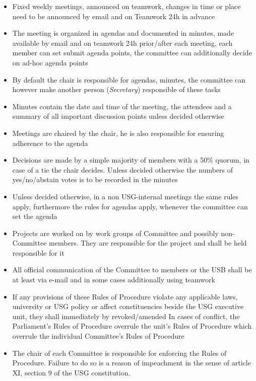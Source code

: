 \begin{itemize}
	\item Fixed weekly meetings, announced on teamwork, changes in time or place need to be announced by email and on Teamwork 24h in advance
	\item The meeting is organized in agendas and documented in minutes, made available by email and on teamwork 24h prior/after each meeting, each member can set submit agenda points, the committee can additionally decide on ad-hoc agenda points
	\item By default the chair is responsible for agendas, minutes, the committee can however make another person (\emph{Secretary}) responsible of these tasks
	\item Minutes contain the date and time of the meeting, the attendees and a summary of all important discussion points unless decided otherwise
	\item Meetings are chaired by the chair, he is also responsible for ensuring adherence to the agenda
	\item Decisions are made by a simple majority of members with a 50\% quorum, in case of a tie the chair decides. Unless decided otherwise the numbers of yes/no/abstain votes is to be recorded in the minutes
	\item Unless decided otherwise, in a non USG-internal meetings the same rules apply, furthermore the rules for agendas apply, whenever the committee can set the agenda
	\item Projects are worked on by work groups of Committee and possibly non-Committee members. They are responsible for the project and shall be held responsible for it
	\item All official communication of the Committee to members or the USB shall be at least via e-mail and in some cases additionally using teamwork
	\item If any provisions of these Rules of Procedure violate any applicable laws, university or USG policy or affect constituencies beside the USG executive unit, they shall immediately by revoked/amended
	In cases of conflict, the Parliament's Rules of Procedure overrule the unit's Rules of Procedure which overrule the individual Committee's Rules of Procedure
	\item The chair of each Committee is responsible for enforcing the Rules of Procedure. Failure to do so is a reason of impeachment in the sense of article XI, section 9 of the USG constitution.
\end{itemize}